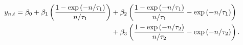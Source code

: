\begin{equation} \label{eq:NSSzero}
	\begin{split}
		\yZero = \betaLT + \betaST \left(\loadSTnsZero\right) 
		& + \betaMTns \loadMTnsZero \\
		& + \betaMTnss \loadMTnssZero.
	\end{split}
\end{equation}